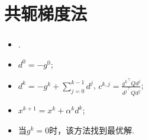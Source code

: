 \documentclass{beamer}
\begin{document}
	\section{共轭梯度法}
	\begin{frame}
		\frametitle{\secno \secname}
		\begin{itemize}
			\item {} .
			\item $d^0=-g^0$;
			
			\item $d^k=-{g}^k+\sum_{j=0}^{k-1} d^j$, $c^{k,j}=  \frac{{g^k}^{\top}Qd^j}{{d^j}^{\top}Qd^j}$;
			\item $x^{k+1} = x^k + {\alpha}^kd^k$;
			\item 当$g^k = 0$时，该方法找到最优解.
		\end{itemize}
		
	\end{frame}
	
\end{document}
